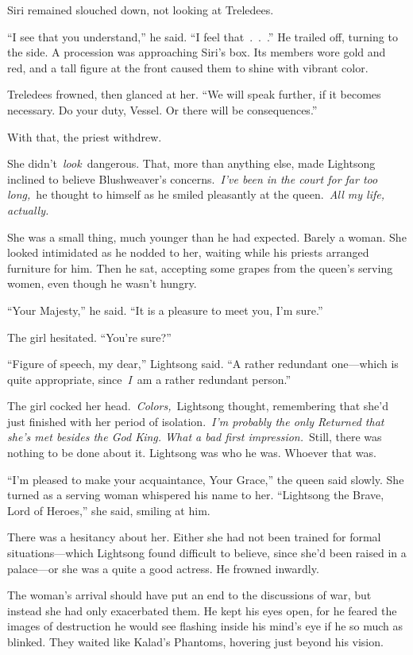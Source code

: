 Siri remained slouched down, not looking at Treledees.

“I see that you understand,” he said. “I feel that~.~.~.” He trailed off, turning to the side. A procession was approaching Siri’s box. Its members wore gold and red, and a tall figure at the front caused them to shine with vibrant color.

Treledees frowned, then glanced at her. “We will speak further, if it becomes necessary. Do your duty, Vessel. Or there will be consequences.”

With that, the priest withdrew.

\orn

She didn’t~\textit{look}~dangerous. That, more than anything else, made Lightsong inclined to believe Blushweaver’s concerns.~\textit{I’ve been in the court for far too long,}~he thought to himself as he smiled pleasantly at the queen.~\textit{All my life, actually.}

She was a small thing, much younger than he had expected. Barely a woman. She looked intimidated as he nodded to her, waiting while his priests arranged furniture for him. Then he sat, accepting some grapes from the queen’s serving women, even though he wasn’t hungry.

“Your Majesty,” he said. “It is a pleasure to meet you, I’m sure.”

The girl hesitated. “You’re sure?”

“Figure of speech, my dear,” Lightsong said. “A rather redundant one—which is quite appropriate, since~\textit{I}~am a rather redundant person.”

The girl cocked her head.~\textit{Colors,}~Lightsong thought, remembering that she’d just finished with her period of isolation.~\textit{I’m probably the only Returned that she’s met besides the God King. What a bad first impression.}~Still, there was nothing to be done about it. Lightsong was who he was. Whoever that was.

“I’m pleased to make your acquaintance, Your Grace,” the queen said slowly. She turned as a serving woman whispered his name to her. “Lightsong the Brave, Lord of Heroes,” she said, smiling at him.

There was a hesitancy about her. Either she had not been trained for formal situations—which Lightsong found difficult to believe, since she’d been raised in a palace—or she was a quite a good actress. He frowned inwardly.

The woman’s arrival should have put an end to the discussions of war, but instead she had only exacerbated them. He kept his eyes open, for he feared the images of destruction he would see flashing inside his mind’s eye if he so much as blinked. They waited like Kalad’s Phantoms, hovering just beyond his vision.

